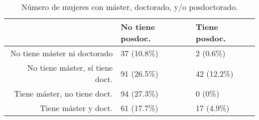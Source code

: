 \begin{table}[ht]
\centering
\begin{tabular}{rll}
  \hline
 & No tiene posdoc. & Tiene posdoc. \\ 
  \hline
No tiene máster ni doctorado & 37 (10.8\%) & 2 (0.6\%) \\ 
  No tiene máster, sí tiene doct. & 91 (26.5\%) & 42 (12.2\%) \\ 
  Tiene máster, no tiene doct. & 94 (27.3\%) & 0 (0\%) \\ 
  Tiene máster y doct. & 61 (17.7\%) & 17 (4.9\%) \\ 
   \hline
\end{tabular}
\caption{Número de mujeres con máster, doctorado, y/o posdoctorado.} 
\label{tab:countwomen}
\end{table}
